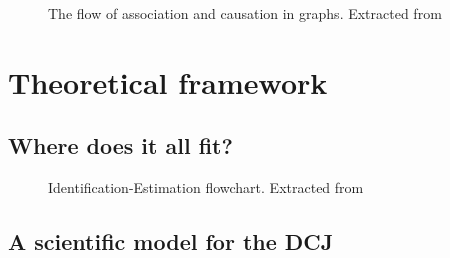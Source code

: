 \documentclass[
  authoryear,
  preprint,
  1p]{elsarticle}
\begin{document}
\begin{figure}


\caption{\label{fig-ACflow}The flow of association and causation in
graphs. Extracted from \citet[31]{Neal_2020}}

\end{figure}%

\section{Theoretical framework}\label{sec-theory}

\subsection{Where does it all fit?}\label{sec-theory-where}

\begin{figure}


\caption{\label{fig-IEflow}Identification-Estimation flowchart.
Extracted from \citet[32]{Neal_2020}}

\end{figure}%

\subsection{A scientific model for the DCJ}\label{sec-theory-scientific}
\end{document}
